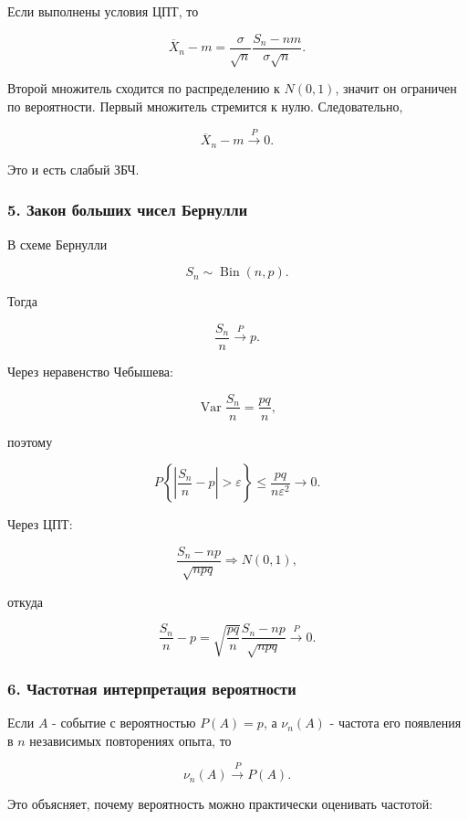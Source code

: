 \documentclass[
  11pt,
  a4paper,
]{article}
\begin{document}
Если выполнены условия ЦПТ, то

\[
\overline X_n-m
=
\frac{\sigma}{\sqrt n}
\frac{S_n-nm}{\sigma\sqrt n}.
\]

Второй множитель сходится по распределению к \(N(0,1)\), значит он
ограничен по вероятности. Первый множитель стремится к нулю.
Следовательно,

\[
\overline X_n-m\xrightarrow{P}0.
\]

Это и есть слабый ЗБЧ.

\subsubsection{5. Закон больших чисел
Бернулли}\label{ux437ux430ux43aux43eux43d-ux431ux43eux43bux44cux448ux438ux445-ux447ux438ux441ux435ux43b-ux431ux435ux440ux43dux443ux43bux43bux438}

В схеме Бернулли

\[
S_n\sim\operatorname{Bin}(n,p).
\]

Тогда

\[
\frac{S_n}{n}\xrightarrow{P}p.
\]

Через неравенство Чебышева:

\[
\operatorname{Var}\frac{S_n}{n}
=
\frac{pq}{n},
\]

поэтому

\[
P\left\{
\left|\frac{S_n}{n}-p\right|>\varepsilon
\right\}
\le
\frac{pq}{n\varepsilon^2}
\to0.
\]

Через ЦПТ:

\[
\frac{S_n-np}{\sqrt{npq}}
\Rightarrow
N(0,1),
\]

откуда

\[
\frac{S_n}{n}-p
=
\sqrt{\frac{pq}{n}}
\frac{S_n-np}{\sqrt{npq}}
\xrightarrow{P}0.
\]

\subsubsection{6. Частотная интерпретация
вероятности}\label{ux447ux430ux441ux442ux43eux442ux43dux430ux44f-ux438ux43dux442ux435ux440ux43fux440ux435ux442ux430ux446ux438ux44f-ux432ux435ux440ux43eux44fux442ux43dux43eux441ux442ux438}

Если \(A\) - событие с вероятностью \(P(A)=p\), а \(\nu_n(A)\) - частота
его появления в \(n\) независимых повторениях опыта, то

\[
\nu_n(A)\xrightarrow{P}P(A).
\]

Это объясняет, почему вероятность можно практически оценивать частотой:
\end{document}
